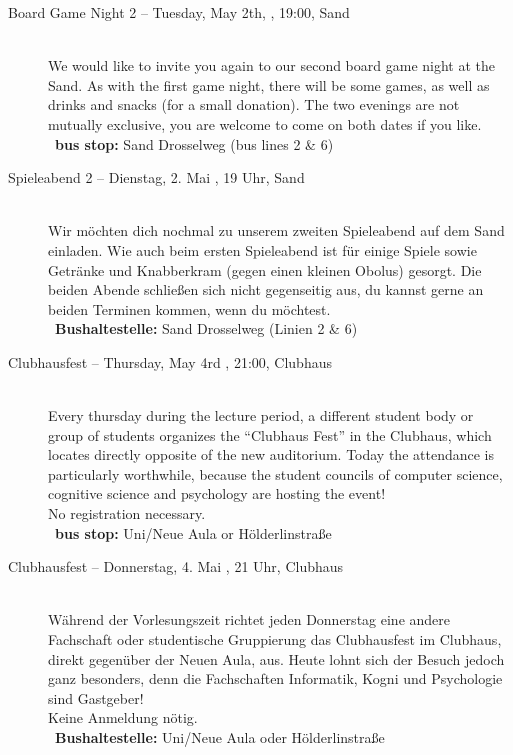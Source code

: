\begin{description}
\ifml
	\item[Board Game Night 2 -- Tuesday, May 2th, \YEAR, 19:00, Sand]~\\
	We would like to invite you again to our second board game night at the Sand.
	As with the first game night, there will be some games, as well as drinks and snacks (for a small donation).
	The two evenings are not mutually exclusive, you are welcome to come on both dates if you like.
	~\textbf{bus stop:} Sand Drosselweg (bus lines 2 \& 6)
\else
	\item[Spieleabend 2 -- Dienstag, 2. Mai \YEAR, 19 Uhr, Sand]~\\
	Wir möchten dich nochmal zu unserem zweiten Spieleabend auf dem Sand einladen.
	Wie auch beim ersten Spieleabend ist für einige Spiele sowie Getränke und Knabberkram (gegen einen kleinen Obolus) gesorgt.
	Die beiden Abende schließen sich nicht gegenseitig aus, du kannst gerne an beiden Terminen kommen, wenn du möchtest.\\
	~\textbf{Bushaltestelle:} Sand Drosselweg (Linien 2 \& 6)
\fi

\ifml
    \item[Clubhausfest -- Thursday, May 4rd \YEAR, 21:00, Clubhaus]\ \\
	Every thursday during the lecture period, a different student body or group of students organizes the "`Clubhaus Fest"' in
	the Clubhaus, which locates directly opposite of the new auditorium. Today the attendance is particularly worthwhile, because
	the student councils of computer science, cognitive science and psychology are hosting the event! \\
	No registration necessary.\\
	~\textbf{bus stop:} Uni/Neue Aula or Hölderlinstraße
\else
    \item[Clubhausfest -- Donnerstag, 4. Mai \YEAR, 21 Uhr, Clubhaus]\ \\
	Während der Vorlesungszeit richtet jeden Donnerstag eine andere Fachschaft oder studentische Gruppierung das Clubhausfest
	im Clubhaus, direkt gegenüber der Neuen Aula, aus. Heute lohnt sich der Besuch jedoch ganz besonders, denn die Fachschaften
	Informatik, Kogni und Psychologie sind Gastgeber! \\
	Keine Anmeldung nötig.\\
	~\textbf{Bushaltestelle:} Uni/Neue Aula oder Hölderlinstraße
\fi


\end{description}
